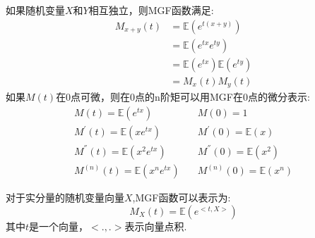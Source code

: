\documentclass[fontset=none,oneside]{book}
\begin{document}
如果随机变量$X$和$Y$相互独立，则MGF函数满足:
\begin{equation}
\label{eq:42}
\begin{split}
M_{x+y}(t) & = \mathbb{E}(e^{t(x+y)}) \\
          & = \mathbb{E}(e^{tx}e^{ty}) \\
          & = \mathbb{E}(e^{tx})\mathbb{E}{(e^{ty})} \\
          & = M_{x}(t)M_{y}(t)
\end{split}
\end{equation}
如果$M(t)$在0点可微，则在0点的n阶矩可以用MGF在0点的微分表示:
\begin{equation}
\label{eq:43}
\begin{split}
M(t)=\mathbb{E}(e^{tx}) &\quad M(0)=1 \\
M^{'}(t)=\mathbb{E}(xe^{tx}) &\quad M^{'}(0)=\mathbb{E}(x) \\
M^{''}(t)=\mathbb{E}(x^{2}e^{tx}) &\quad M^{''}(0)=\mathbb{E}(x^{2})
\\
M^{(n)}(t)=\mathbb{E}(x^{n}e^{tx}) &\quad M^{(n)}(0)=\mathbb{E}(x^{n})
\end{split}
\end{equation}

对于实分量的随机变量向量$X$,MGF函数可以表示为:
\begin{equation}
\label{eq:44}
M_{X}(t)=\mathbb{E}(e^{<t,X>})
\end{equation}
其中$t$是一个向量，$<.,.>$表示向量点积.
\end{document}

